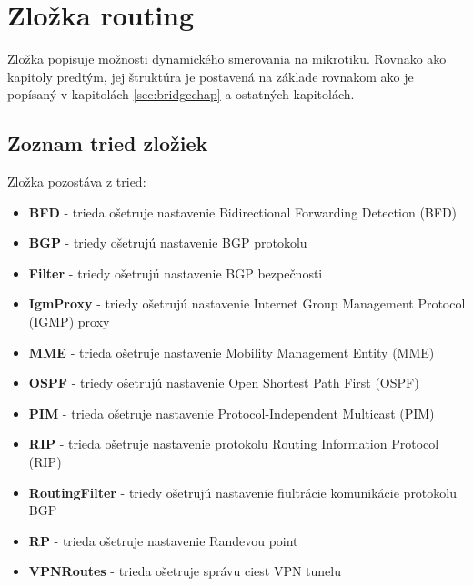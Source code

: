\section{Zložka routing}
Zložka popisuje možnosti dynamického smerovania na mikrotiku. Rovnako ako kapitoly predtým, jej štruktúra je postavená na základe rovnakom ako je popísaný v kapitolách \ref{sec:bridgechap} a ostatných kapitolách.
\subsection{Zoznam tried zložiek}
Zložka pozostáva z tried:
\begin{itemize}
\item \textbf{BFD} - trieda ošetruje nastavenie Bidirectional Forwarding Detection (BFD)
\item \textbf{BGP} - triedy ošetrujú nastavenie BGP protokolu
\item \textbf{Filter} - triedy ošetrujú nastavenie BGP bezpečnosti
\item \textbf{IgmProxy} - triedy ošetrujú nastavenie  Internet Group Management Protocol (IGMP) proxy
\item \textbf{MME} - trieda ošetruje nastavenie Mobility Management Entity (MME)
\item \textbf{OSPF} - triedy ošetrujú nastavenie Open Shortest Path First (OSPF)
\item \textbf{PIM} - trieda ošetruje nastavenie Protocol-Independent Multicast  (PIM)
\item \textbf{RIP} - trieda ošetruje nastavenie protokolu Routing Information Protocol (RIP)
\item \textbf{RoutingFilter} - triedy ošetrujú nastavenie fiultrácie komunikácie protokolu BGP
\item \textbf{RP} - trieda ošetruje nastavenie Randevou point 
\item \textbf{VPNRoutes} - trieda ošetruje správu ciest VPN tunelu
\end{itemize}
